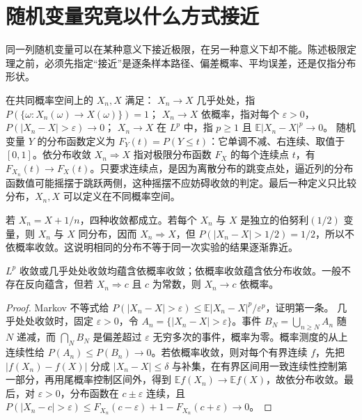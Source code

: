 \section{随机变量究竟以什么方式接近}

同一列随机变量可以在某种意义下接近极限，在另一种意义下却不能。陈述极限定理之前，必须先指定“接近”是逐条样本路径、偏差概率、平均误差，还是仅指分布形状。

\begin{definition}[四种收敛]
在共同概率空间上的 \(X_n,X\) 满足：
\(X_n\to X\) 几乎处处，指
\(P(\{\omega:X_n(\omega)\to X(\omega)\})=1\)；
\(X_n\to X\) 依概率，指对每个 \(\varepsilon>0\)，
\(P(|X_n-X|>\varepsilon)\to0\)；
\(X_n\to X\) 在 \(L^p\) 中，指 \(p\ge1\) 且
\(\mathbb E|X_n-X|^p\to0\)。
随机变量 \(Y\) 的分布函数定义为
\(F_Y(t)=P(Y\le t)\)：它单调不减、右连续、取值于
\([0,1]\)。依分布收敛 \(X_n\Rightarrow X\) 指对极限分布函数 \(F_X\) 的每个连续点 \(t\)，有 \(F_{X_n}(t)\to F_X(t)\)。只要求连续点，是因为离散分布的跳变点处，逼近列的分布函数值可能摇摆于跳跃两侧，这种摇摆不应妨碍收敛的判定。最后一种定义只比较分布，\(X_n,X\) 可以定义在不同概率空间。
\end{definition}

若 \(X_n=X+1/n\)，四种收敛都成立。若每个 \(X_n\) 与 \(X\) 是独立的伯努利\((1/2)\) 变量，则 \(X_n\) 与 \(X\) 同分布，因而 \(X_n\Rightarrow X\)，但
\(P(|X_n-X|>1/2)=1/2\)，所以不依概率收敛。这说明相同的分布不等于同一次实验的结果逐渐靠近。

\begin{proposition}[收敛方式的蕴含]
\(L^p\) 收敛或几乎处处收敛均蕴含依概率收敛；依概率收敛蕴含依分布收敛。一般不存在反向蕴含，但若 \(X_n\Rightarrow c\) 且 \(c\) 为常数，则 \(X_n\to c\) 依概率。
\end{proposition}
\begin{proof}
Markov 不等式给
\(P(|X_n-X|>\varepsilon)\le\mathbb E|X_n-X|^p/\varepsilon^p\)，证明第一条。
几乎处处收敛时，固定 \(\varepsilon>0\)，令
\(A_n=\{|X_n-X|>\varepsilon\}\)。事件
\(B_N=\bigcup_{n\ge N}A_n\) 随 \(N\) 递减，而
\(\bigcap_NB_N\) 是偏差超过 \(\varepsilon\) 无穷多次的事件，概率为零。概率测度的从上连续性给
\(P(A_n)\le P(B_n)\to0\)。若依概率收敛，则对每个有界连续 \(f\)，先把 \(|f(X_n)-f(X)|\) 分成 \(|X_n-X|\le\delta\) 与补集，在有界区间用一致连续性控制第一部分，再用尾概率控制区间外，得到 \(\mathbb E f(X_n)\to\mathbb E f(X)\)，故依分布收敛。最后，对 \(\varepsilon>0\)，分布函数在 \(c\pm\varepsilon\) 连续，且
\(P(|X_n-c|>\varepsilon)\le F_{X_n}(c-\varepsilon)+1-F_{X_n}(c+\varepsilon)\to0\)。
\end{proof}

